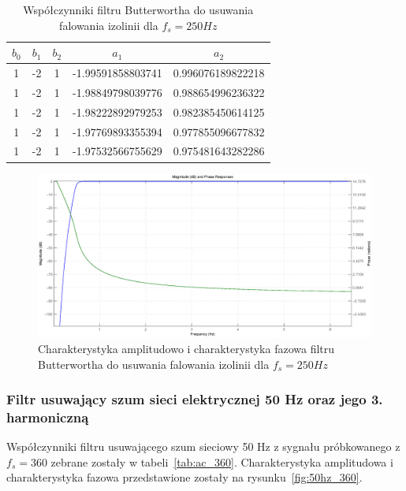 \begin{table}[H]
\begin{center}
\begin{tabular}{|c|c|c|c|c|}
\hline
        $b_0$ & $b_1$ & $b_2$ & $a_1$ & $a_2$ \\
\hline
        1& -2& 1& -1.99591858803741& 0.996076189822218\\
\hline
        1& -2& 1& -1.98849798039776& 0.988654996236322\\
\hline
        1& -2& 1& -1.98222892979253& 0.982385450614125\\
\hline
        1& -2& 1& -1.97769893355394& 0.977855096677832\\
\hline
        1& -2& 1& -1.97532566755629& 0.975481643282286\\
\hline
\end{tabular}
\caption{Współczynniki filtru Butterwortha do usuwania falowania izolinii dla $f_s=250 Hz$}
\label{tab:bw_250}
\end{center} 
\end{table}

\begin{figure}[H]
\centering
	\includegraphics[width=\textwidth]{ECG_BASELINE/figures/bw_250.eps}
\caption{Charakterystyka amplitudowo i charakterystyka fazowa filtru Butterwortha do usuwania falowania izolinii dla $f_s=250 Hz$}
\label{fig:bw_250}
\end{figure}


\subsubsection{Filtr usuwający szum sieci elektrycznej 50 Hz oraz jego 3. harmoniczną}

Współczynniki filtru usuwającego szum sieciowy 50 Hz z sygnału próbkowanego z $f_s = 360$  zebrane zostały w tabeli~\ref{tab:ac_360}. Charakterystyka amplitudowa i charakterystyka fazowa przedstawione zostały na rysunku~\ref{fig:50hz_360}.

